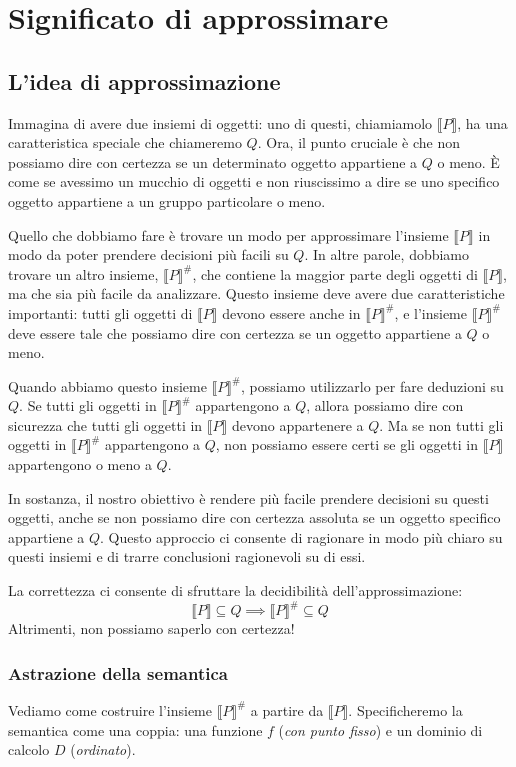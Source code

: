 \chapter{Significato di approssimare}
\section{L'idea di approssimazione}
Immagina di avere due insiemi di oggetti: uno di questi, chiamiamolo $\llbracket P \rrbracket$,
ha una caratteristica speciale che chiameremo $Q$. Ora, il punto cruciale è che non possiamo dire
con certezza se un determinato oggetto appartiene a $Q$ o meno. È come se avessimo un mucchio di
oggetti e non riuscissimo a dire se uno specifico oggetto appartiene a un gruppo particolare o meno.

Quello che dobbiamo fare è trovare un modo per approssimare l'insieme $\llbracket P \rrbracket$
in modo da poter prendere decisioni più facili su $Q$. In altre parole, dobbiamo trovare un altro
insieme, $\llbracket P \rrbracket^\#$, che contiene la maggior parte degli oggetti di $\llbracket P \rrbracket$,
ma che sia più facile da analizzare. Questo insieme deve avere due caratteristiche importanti: tutti gli
oggetti di $\llbracket P \rrbracket$ devono essere anche in $\llbracket P \rrbracket^\#$, e l'insieme
$\llbracket P \rrbracket^\#$ deve essere tale che possiamo dire con certezza se un oggetto appartiene a $Q$ o meno.

Quando abbiamo questo insieme $\llbracket P \rrbracket^\#$, possiamo utilizzarlo per fare deduzioni
su $Q$. Se tutti gli oggetti in $\llbracket P \rrbracket^\#$ appartengono a $Q$, allora possiamo dire
con sicurezza che tutti gli oggetti in $\llbracket P \rrbracket$ devono appartenere a $Q$. Ma se non
tutti gli oggetti in $\llbracket P \rrbracket^\#$ appartengono a $Q$, non possiamo essere certi se gli
oggetti in $\llbracket P \rrbracket$ appartengono o meno a $Q$.

In sostanza, il nostro obiettivo è rendere più facile prendere decisioni su questi oggetti, anche se non
possiamo dire con certezza assoluta se un oggetto specifico appartiene a $Q$. Questo approccio ci consente
di ragionare in modo più chiaro su questi insiemi e di trarre conclusioni ragionevoli su di essi.

La correttezza ci consente di sfruttare la decidibilità dell'approssimazione:
\[
  \llbracket P \rrbracket \subseteq Q \implies \llbracket P \rrbracket^\# \subseteq Q  
\]
Altrimenti, non possiamo saperlo con certezza!
\subsection{Astrazione della semantica}
Vediamo come costruire l'insieme $\llbracket P \rrbracket^\#$ a partire da $\llbracket P \rrbracket$.
Specificheremo la semantica come una coppia: una funzione $f$ (\textit{con punto fisso}) e un
dominio di calcolo $D$ (\textit{ordinato}).

